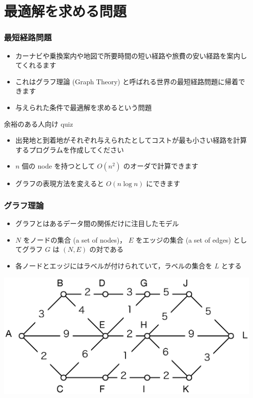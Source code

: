 \section{最適解を求める問題}
\begin{frame}
\frametitle{最短経路問題}
  \begin{itemize}
\item カーナビや乗換案内や地図で所要時間の短い経路や旅費の安い経路を案内してくれるます
\item これはグラフ理論 (Graph Theory) と呼ばれる世界の最短経路問題に帰着できます
\item 与えられた条件で最適解を求めるという問題
  \end{itemize}
  \begin{block}{余裕のある人向け quiz}
    \begin{itemize}
\item 出発地と到着地がそれぞれ与えられたとしてコストが最も小さい経路を計算するプログラムを作成してください
\item $n$ 個の node を持つとして \(O(n^2)\) のオーダで計算できます
\item グラフの表現方法を変えると \(O(n\log n)\) にできます
    \end{itemize}
  \end{block}
\end{frame}
\begin{frame}
\frametitle{グラフ理論}
  \begin{itemize}
\item グラフとはあるデータ間の関係だけに注目したモデル
\item $N$ をノードの集合 (a set of nodes)， $E$ をエッジの集合 (a set of edges) としてグラフ $G$ は \((N,E)\) の対である
\item 各ノードとエッジにはラベルが付けられていて，ラベルの集合を $L$ とする
  \end{itemize}
  \begin{center}
\includegraphics[scale=0.5]{./Figure/elementaryCS-2nd-figSPP.eps}
  \end{center}
\end{frame}

